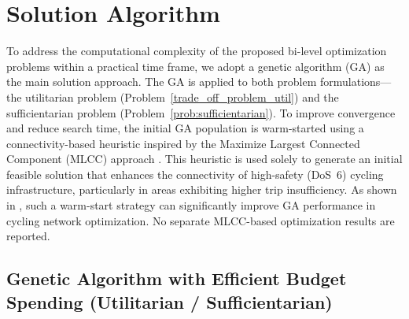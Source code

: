 \documentclass[lettersize,journal]{IEEEtran}
\begin{document}
\section{Solution Algorithm}
\label{solution_algorithm}

To address the computational complexity of the proposed bi-level optimization problems within a practical time frame, we adopt a genetic algorithm (GA) as the main solution approach. The GA is applied to both problem formulations—the utilitarian problem (Problem~\ref{trade_off_problem_util}) and the sufficientarian problem (Problem~\ref{prob:sufficientarian}).
To improve convergence and reduce search time, the initial GA population is warm-started using a connectivity-based heuristic inspired by the Maximize Largest Connected Component (MLCC) approach \cite{2024graphbased}. This heuristic is used solely to generate an initial feasible solution that enhances the connectivity of high-safety (DoS~6) cycling infrastructure, particularly in areas exhibiting higher trip insufficiency. As shown in \cite{jurado2025graph}, such a warm-start strategy can significantly improve GA performance in cycling network optimization. No separate MLCC-based optimization results are reported.

\subsection{Genetic Algorithm with Efficient Budget Spending (Utilitarian / Sufficientarian)}
\end{document}
